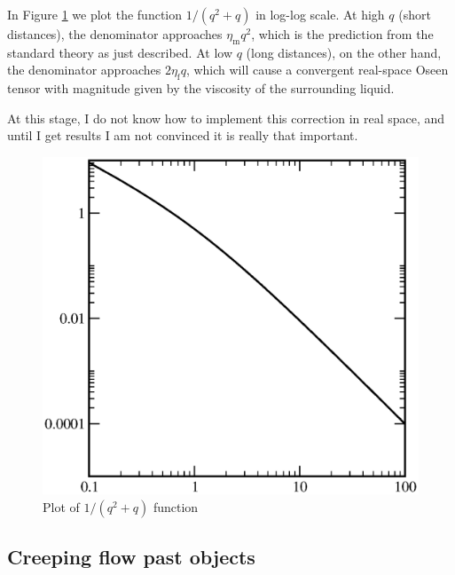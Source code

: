 In Figure \ref{fig:SD} we plot the function $1/(q^2+q)$ in log-log
scale.  At high $q$ (short distances), the denominator approaches
\( \eta_\mathrm{m} q^2 \),
which is the prediction from the standard theory as just described. At
low $q$ (long distances), on the other hand, the denominator
approaches \( 2 \eta_\mathrm{f} q \),
which will cause a convergent real-space Oseen tensor with magnitude
given by the viscosity of the surrounding liquid.

At this stage, I do not know how to implement this correction in real
space, and until I get results I am not convinced it is really that
important.

\begin{figure}
  \centering
  \begin{minipage}{0.45\textwidth}
      \includegraphics[width=\textwidth]{figures/SD}
  \end{minipage}
  \caption{Plot of $1/(q^2+q)$ function
    \label{fig:SD}}
\end{figure}



\subsection{Creeping flow past objects}



